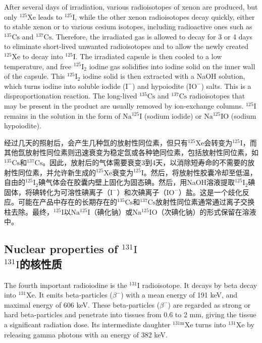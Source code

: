 \documentclass[dvipsnames, svgnames,a4paper,11pt]{article}
\begin{document}
After several days of irradiation, various radioisotopes of xenon are produced, but only \(\mathrm{^{125}Xe}\) leads to \(\mathrm{^{125}I}\), while the other xenon radioisotopes decay quickly, either to stable xenon or to various cesium isotopes, including radioactive ones such as \(\mathrm{^{135}Cs}\) and \(\mathrm{^{137}Cs}\). Therefore, the irradiated gas is allowed to decay for 3 or 4 days to eliminate short-lived unwanted radioisotopes and to allow the newly created \(\mathrm{^{125}Xe}\) to decay into \(\mathrm{^{125}I}\). The irradiated capsule is then cooled to a low temperature, and free \(\mathrm{^{125}I_2}\) iodine gas solidifies into iodine solid on the inner wall of the capsule. This \(\mathrm{^{125}I_2}\) iodine solid is then extracted with a NaOH solution, which turns iodine into soluble iodide (\(\mathrm{I^{-}}\)) and hypoiodite (\(\mathrm{IO^{-}}\)) salts. This is a disproportionation reaction. The long-lived \(\mathrm{^{135}Cs}\) and \(\mathrm{^{137}Cs}\) radioisotopes that may be present in the product are usually removed by ion-exchange columns. \(\mathrm{^{125}I}\) remains in the solution in the form of \(\mathrm{Na^{125}I}\) (sodium iodide) or \(\mathrm{Na^{125}IO}\) (sodium hypoiodite).

经过几天的照射后，会产生几种氙的放射性同位素，但只有\(\mathrm{^{125}Xe}\)会转变为\(\mathrm{^{125}I}\)，而其他氙放射性同位素则迅速衰变为稳定氙或各种铯同位素，包括放射性同位素，如\(\mathrm{^{135}Cs}\)和\(\mathrm{^{137}Cs}\)。因此，放射后的气体需要衰变3到4天，以消除短寿命的不需要的放射性同位素，并允许新生成的\(\mathrm{^{125}Xe}\)衰变为\(\mathrm{^{125}I}\)。然后，将放射性胶囊冷却至低温，自由的\(\mathrm{^{125}I_2}\)碘气体会在胶囊内壁上固化为固态碘。然后，用NaOH溶液提取\(\mathrm{^{125}I_2}\)碘固体，将碘转化为可溶性碘离子（\(\mathrm{I^{-}}\)）和次碘离子（\(\mathrm{IO^{-}}\)）盐。这是一个歧化反应。可能在产品中存在的长期存在的\(\mathrm{^{135}Cs}\)和\(\mathrm{^{137}Cs}\)放射性同位素通常通过离子交换柱去除。最终，\(\mathrm{^{125}I}\)以\(\mathrm{Na^{125}I}\)（碘化钠）或\(\mathrm{Na^{125}IO}\)（次碘化钠）的形式保留在溶液中。

\subsection{Nuclear properties of \(\mathrm{^{131}I}\)\\ \(\mathrm{^{131}I}\)的核性质}  
The fourth important radioiodine is the \(\mathrm{^{131}I}\) radioisotope. It decays by beta decay into \(\mathrm{^{131}Xe}\). It emits beta-particles (\(\beta^-\)) with a mean energy of 191 keV, and maximal energy of 606 keV. These beta-particles (\(\beta^-\)) are regarded as strong or hard beta-particles and penetrate into tissues from 0.6 to 2 mm, giving the tissue a significant radiation dose. Its intermediate daughter \(\mathrm{^{131m}Xe}\) turns into \(\mathrm{^{131}Xe}\) by releasing gamma photons with an energy of 382 keV.
\end{document}
